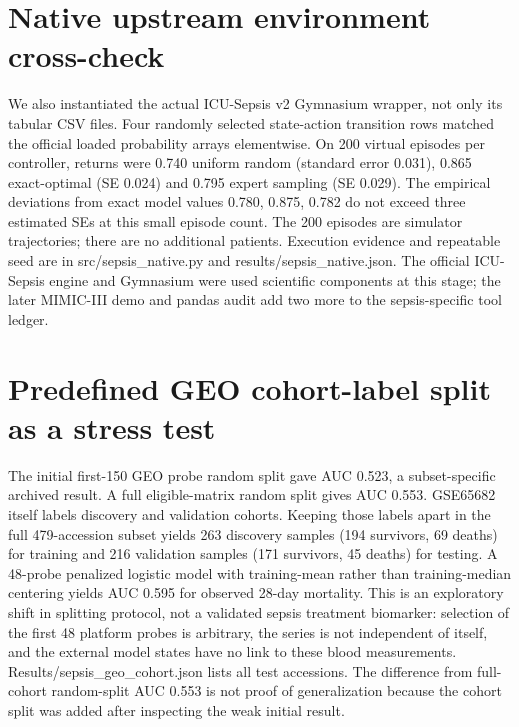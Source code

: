\section{Native upstream environment cross-check}
We also instantiated the actual ICU-Sepsis v2 Gymnasium wrapper, not only its tabular CSV files. Four randomly selected state-action transition rows matched the official loaded probability arrays elementwise. On 200 virtual episodes per controller, returns were 0.740 uniform random (standard error 0.031), 0.865 exact-optimal (SE 0.024) and 0.795 expert sampling (SE 0.029). The empirical deviations from exact model values 0.780, 0.875, 0.782 do not exceed three estimated SEs at this small episode count. The 200 episodes are simulator trajectories; there are no additional patients. Execution evidence and repeatable seed are in src/sepsis\_native.py and results/sepsis\_native.json. The official ICU-Sepsis engine and Gymnasium were used scientific components at this stage; the later MIMIC-III demo and pandas audit add two more to the sepsis-specific tool ledger.

\section{Predefined GEO cohort-label split as a stress test}
The initial first-150 GEO probe random split gave AUC 0.523, a subset-specific archived result. A full eligible-matrix random split gives AUC 0.553. GSE65682 itself labels discovery and validation cohorts. Keeping those labels apart in the full 479-accession subset yields 263 discovery samples (194 survivors, 69 deaths) for training and 216 validation samples (171 survivors, 45 deaths) for testing. A 48-probe penalized logistic model with training-mean rather than training-median centering yields AUC 0.595 for observed 28-day mortality. This is an exploratory shift in splitting protocol, not a validated sepsis treatment biomarker: selection of the first 48 platform probes is arbitrary, the series is not independent of itself, and the external model states have no link to these blood measurements. Results/sepsis\_geo\_cohort.json lists all test accessions. The difference from full-cohort random-split AUC 0.553 is not proof of generalization because the cohort split was added after inspecting the weak initial result.

